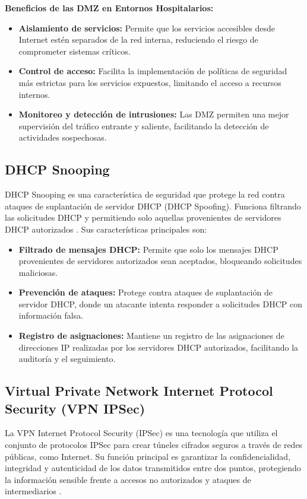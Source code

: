 \textbf{Beneficios de las DMZ en Entornos Hospitalarios:}
\begin{itemize}
    \item \textbf{Aislamiento de servicios:} Permite que los servicios accesibles desde Internet estén separados de la red interna, reduciendo el riesgo de comprometer sistemas críticos.
    \item \textbf{Control de acceso:} Facilita la implementación de políticas de seguridad más estrictas para los servicios expuestos, limitando el acceso a recursos internos.
    \item \textbf{Monitoreo y detección de intrusiones:} Las DMZ permiten una mejor supervisión del tráfico entrante y saliente, facilitando la detección de actividades sospechosas.
\end{itemize}

\subsection{DHCP Snooping}
\label{subsec:dhcpsnooping}
DHCP Snooping es una característica de seguridad que protege la red contra ataques de suplantación de servidor DHCP (DHCP Spoofing). Funciona filtrando las solicitudes DHCP y
permitiendo solo aquellas provenientes de servidores DHCP autorizados \cite{cisco_dhcp_snooping}. Sus características principales son:
\begin{itemize}
    \item \textbf{Filtrado de mensajes DHCP:} Permite que solo los mensajes DHCP provenientes de servidores autorizados sean aceptados, bloqueando solicitudes maliciosas.
    \item \textbf{Prevención de ataques:} Protege contra ataques de suplantación de servidor DHCP, donde un atacante intenta responder a solicitudes DHCP con información falsa.
    \item \textbf{Registro de asignaciones:} Mantiene un registro de las asignaciones de direcciones IP realizadas por los servidores DHCP autorizados, facilitando la auditoría y el seguimiento.
\end{itemize}

\subsection{Virtual Private Network Internet Protocol Security (VPN IPSec)}
\label{subsec:ipsec}
La \ac{VPN} Internet Protocol Security (IPSec) es una tecnología que utiliza el conjunto de protocolos IPSec para crear túneles cifrados seguros a través de redes públicas, 
como Internet. Su función principal es garantizar la confidencialidad, integridad y autenticidad de los datos transmitidos entre dos puntos, protegiendo la información 
sensible frente a accesos no autorizados y ataques de intermediarios \cite{ipsec}.

